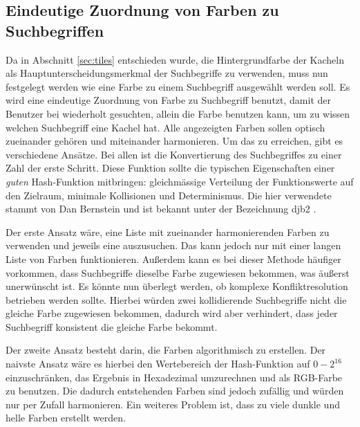 \documentclass[12pt,twoside]{book}
\begin{document}
\subsection{Eindeutige Zuordnung von Farben zu Suchbegriffen}


Da in Abschnitt \ref{sec:tiles} entschieden wurde, die Hintergrundfarbe der Kacheln als Hauptunterscheidungsmerkmal der Suchbegriffe zu verwenden, muss nun festgelegt werden wie eine Farbe zu einem Suchbegriff ausgewählt werden soll.
Es wird eine eindeutige Zuordnung von Farbe zu Suchbegriff benutzt, damit der Benutzer bei wiederholt gesuchten, allein die Farbe benutzen kann, um zu wissen welchen Suchbegriff eine Kachel hat.
Alle angezeigten Farben sollen optisch zueinander gehören und miteinander harmonieren. Um das zu erreichen, gibt es verschiedene Ansätze. Bei allen ist die Konvertierung des Suchbegriffes zu einer Zahl der erste Schritt. Diese Funktion sollte die typischen Eigenschaften einer \textit{guten} Hash-Funktion mitbringen: gleichmässige Verteilung der Funktionswerte auf den Zielraum, minimale Kollisionen und Determinismus.
Die hier verwendete stammt von Dan Bernstein und ist bekannt unter der Bezeichnung djb2 \cite{djb2}.

Der erste Ansatz wäre, eine Liste mit zueinander harmonierenden Farben zu verwenden und jeweils eine auszusuchen. Das kann jedoch nur mit einer langen Liste von Farben funktionieren. Außerdem kann es bei dieser Methode häufiger vorkommen, dass Suchbegriffe dieselbe Farbe zugewiesen bekommen, was äußerst unerwünscht ist. Es könnte nun überlegt werden, ob komplexe Konfliktresolution betrieben werden sollte.
Hierbei würden zwei kollidierende Suchbegriffe nicht die gleiche Farbe zugewiesen bekommen, dadurch wird aber verhindert, dass jeder Suchbegriff konsistent die gleiche Farbe bekommt.


Der zweite Ansatz besteht darin, die Farben algorithmisch zu erstellen.
Der naivste Ansatz wäre es hierbei den Wertebereich der Hash-Funktion auf $0 - 2^{16}$ einzuschränken, das Ergebnis in Hexadezimal umzurechnen und als RGB-Farbe zu benutzen. Die dadurch entstehenden Farben sind jedoch zufällig und würden nur per Zufall harmonieren. Ein weiteres Problem ist, dass zu viele dunkle und helle Farben erstellt werden.
\end{document}
